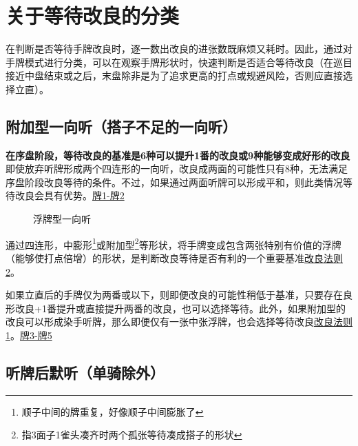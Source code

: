 \section{关于等待改良的分类}
在判断是否等待手牌改良时，逐一数出改良的进张数既麻烦又耗时。因此，通过对手牌模式进行分类，可以在观察手牌形状时，快速判断是否适合等待改良（在巡目接近中盘结束或之后，末盘除非是为了追求更高的打点或规避风险，否则应直接选择立直）。

\subsection{附加型一向听（搭子不足的一向听）}

\textbf{在序盘阶段，等待改良的基准是6种可以提升1番的改良或9种能够变成好形的改良}
即使放弃听牌形成两个四连形的一向听，改良成两面的可能性只有8种，无法满足序盘阶段改良等待的条件。不过，如果通过两面听牌可以形成平和，则此类情况等待改良会具有优势。\hyperref[lec3:pai1-5]{牌1-牌2}

\begin{figure}
    \caption{浮牌型一向听} \label{lec3:pai1-5}
    \par\bigskip
    \par\bigskip
    \par\bigskip
    \par\bigskip
\end{figure}

通过四连形，中膨形\footnote{顺子中间的牌重复，好像顺子中间膨胀了}或附加型\footnote{指3面子1雀头凑齐时两个孤张等待凑成搭子的形状}等形状，将手牌变成包含两张特别有价值的浮牌（能够使打点倍增）的形状，是判断改良等待是否有利的一个重要基准\hyperref[lec3:改良法则2]{改良法则2}。

如果立直后的手牌仅为两番或以下，则即便改良的可能性稍低于基准，只要存在良形改良+1番提升或直接提升两番的改良，也可以选择等待。此外，如果附加型的改良可以形成染手听牌，那么即便仅有一张中张浮牌，也会选择等待改良\hyperref[lec3:改良法则1]{改良法则1}。\hyperref[lec3:pai1-5]{牌3-牌5}


\subsection{听牌后默听（单骑除外）}

